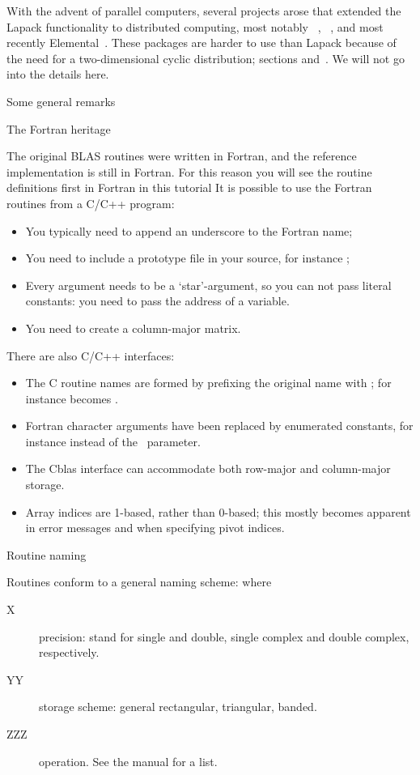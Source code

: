 With the advent of parallel computers, several projects arose that
extended the Lapack functionality to distributed computing, most
notably ~\cite{Choi:scalapack,scalapack-users-guide},
~\cite{PLAPACK,PLAPACK:UG},
and most recently Elemental~\cite{Elemental:TOMS}. These packages are
harder to use than Lapack because of the need for a
two-dimensional cyclic distribution; sections
 and~. We will not go into
the details here.

 {Some general remarks}

 {The Fortran heritage}

The original BLAS routines were written in Fortran, and the reference implementation
is still in Fortran. For this reason you will see the routine definitions first in Fortran
in this tutorial
It is possible to use the Fortran routines from a C/C++ program:
\begin{itemize}
\item You typically need to append an underscore to the Fortran name;
\item You need to include a prototype file in your source, for instance ;
\item Every argument needs to be a `star'-argument, so you can not pass literal constants:
  you need to pass the address of a variable.
\item You need to create a column-major matrix.
\end{itemize}
There are also C/C++ interfaces:
\begin{itemize}
\item The C routine names are formed by prefixing the original name with ;
  for instance  becomes .
\item Fortran character arguments have been replaced by enumerated constants,
  for instance  instead of the~ parameter.
\item The Cblas interface can accommodate both row-major and column-major storage.
\item Array indices are 1-based, rather than 0-based; this mostly
  becomes apparent in error messages and when specifying pivot
  indices.
\end{itemize}

 {Routine naming}

Routines conform to a general naming scheme:  where
\begin{description}
\item[X] precision:  stand for single and double, single
  complex and double complex, respectively.
\item[YY] storage scheme: general rectangular, triangular, banded.
\item[ZZZ] operation. See the manual for a list.
\end{description}

